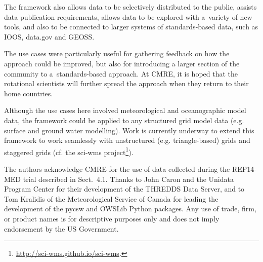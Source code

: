 \documentclass[osd, online, hvmath]{copernicus}
\begin{document}
The framework also allows data to be
selectively distributed to the public, assists data publication
requirements, allows data to be explored with a~variety of new tools,
and also to be connected to larger systems of standards-based data,
such as IOOS, data.gov and GEOSS.

The use cases were particularly useful for gathering feedback on how
the approach could be improved, but also for introducing a larger section of the
community to a~standards-based approach. At CMRE, it is hoped that the
rotational scientists will further spread the approach when they
return to their home countries.

Although the use cases here involved meteorological and oceanographic
model data, the framework could be applied to any structured grid model
data (e.g.  surface and ground water modelling). Work is currently
underway to extend this framework to work seamlessly with unstructured
(e.g. triangle-based) grids and staggered grids (cf. the sci-wms
project\footnote{\url{http://sci-wms.github.io/sci-wms}.}).

\begin{acknowledgements}
  The authors acknowledge CMRE for the use of data collected during
  the REP14-MED trial described in Sect.~4.1. Thanks to John Caron and
  the Unidata Program Center for their development of the THREDDS Data
  Server, and to Tom Kralidis of the Meteorological Service of Canada
  for leading the development of the pycsw and OWSLib Python packages.
  Any use of trade, firm, or product names is for descriptive purposes
  only and does not imply endorsement by the US Government.
\end{acknowledgements}
\end{document}
